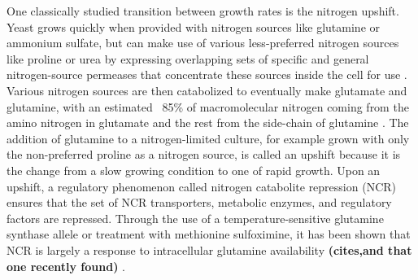 One
classically studied transition between growth rates is the nitrogen
upshift. Yeast grows quickly when provided with nitrogen sources like
glutamine or ammonium sulfate, but can make use of various
less-preferred nitrogen sources like proline or urea by expressing
overlapping sets of specific and general nitrogen-source permeases
that concentrate these sources inside the cell for use
\parencite{greson1992amino}.
Various
nitrogen sources are then catabolized to eventually make glutamate and
glutamine, with an estimated ~85\% of macromolecular nitrogen coming
from the amino nitrogen in glutamate and the rest from the side-chain
of glutamine 
\parencite{magasanik2002nitrogen}. The addition of glutamine to
a nitrogen-limited culture, for example grown with only the
non-preferred proline as a nitrogen source, is called an upshift
because it is the change from a slow growing condition to one of rapid
growth. 
Upon an upshift, a regulatory phenomenon called nitrogen
catabolite repression (NCR) ensures that the set of NCR transporters,
metabolic enzymes, and regulatory factors are repressed.  
Through the use of a temperature-sensitive glutamine synthase
allele or treatment with methionine sulfoximine, it has been shown
that NCR is largely a response to intracellular glutamine 
availability \textbf{(cites,and that one recently found)} . 

